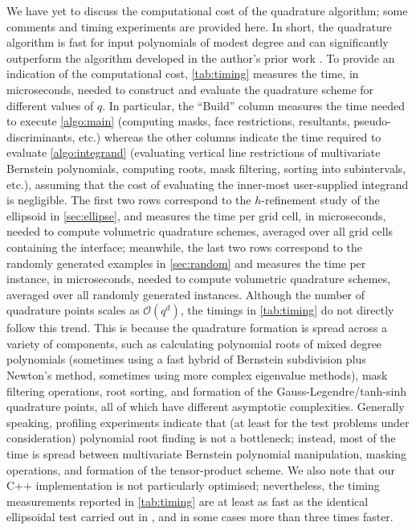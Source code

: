 \documentclass[onefignum,onetabnum,onealgnum,oneeqnum]{siamart190516}
\begin{document}
We have yet to discuss the computational cost of the quadrature algorithm; some comments and timing experiments are provided here. In short, the quadrature algorithm is fast for input polynomials of modest degree and can significantly outperform the algorithm developed in the author's prior work \cite{HighorderImplicitQuad,algoim}. To provide an indication of the computational cost, \cref{tab:timing} measures the time, in microseconds, needed to construct and evaluate the quadrature scheme for different values of $q$. In particular, the ``Build'' column measures the time needed to execute \cref{algo:main} (computing masks, face restrictions, resultants, pseudo-discriminants, etc.) whereas the other columns indicate the time required to evaluate \cref{algo:integrand} (evaluating vertical line restrictions of multivariate Bernstein polynomials, computing roots, mask filtering, sorting into subintervals, etc.), assuming that the cost of evaluating the inner-most user-supplied integrand is negligible. The first two rows correspond to the $h$-refinement study of the ellipsoid in \cref{sec:ellipse}, and measures the time per grid cell, in microseconds, needed to compute volumetric quadrature schemes, averaged over all grid cells containing the interface; meanwhile, the last two rows correspond to the randomly generated examples in \cref{sec:random} and measures the time per instance, in microseconds, needed to compute volumetric quadrature schemes, averaged over all randomly generated instances. Although the number of quadrature points scales as ${\mathcal O}(q^d)$, the timings in \cref{tab:timing} do not directly follow this trend. This is because the quadrature formation is spread across a variety of components, such as calculating polynomial roots of mixed degree polynomials (sometimes using a fast hybrid of Bernstein subdivision plus Newton's method, sometimes using more complex eigenvalue methods), mask filtering operations, root sorting, and formation of the Gauss-Legendre/tanh-sinh quadrature points, all of which have different asymptotic complexities. Generally speaking, profiling experiments indicate that (at least for the test problems under consideration) polynomial root finding is not a bottleneck; instead, most of the time is spread between multivariate Bernstein polynomial manipulation, masking operations, and formation of the tensor-product scheme. We also note that our C++ implementation is not particularly optimised; nevertheless, the timing measurements reported in \cref{tab:timing} are at least as fast as the identical ellipsoidal test carried out in \cite{HighorderImplicitQuad}, and in some cases more than three times faster.
\end{document}
